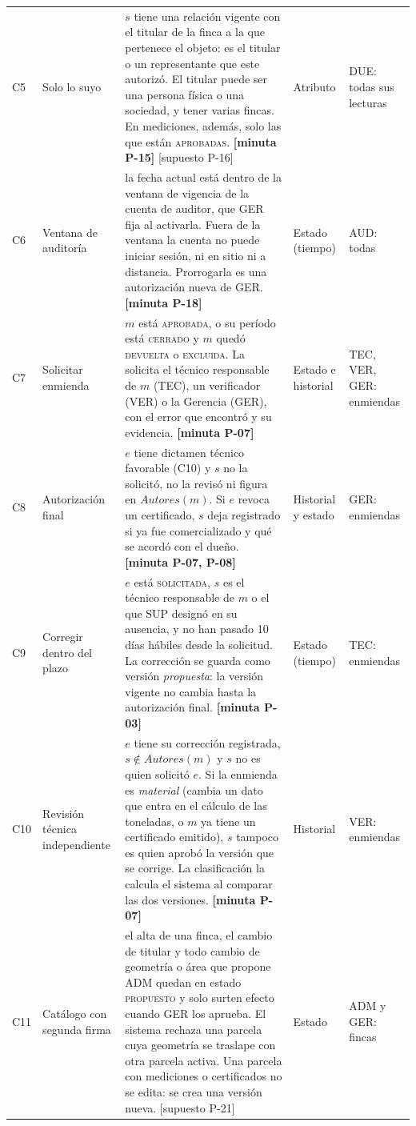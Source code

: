 \documentclass[11pt,letterpaper]{article}
\newcommand{\resp}[1]{\textrm{\footnotesize\bfseries [minuta #1]}}
\newcommand{\supu}[1]{\textrm{\footnotesize [supuesto #1]}}
\newcommand{\est}[1]{\textsc{\small #1}}
\begin{document}
{\begin{longtable}{@{}L{0.8cm} L{2.5cm} L{8.0cm} L{1.7cm} L{1.95cm}@{}}
C5 & Solo lo suyo &
$s$ tiene una relación vigente con el titular de la finca a la que pertenece el objeto: es el titular
o un representante que este autorizó. El titular puede ser una persona física o una sociedad, y tener
varias fincas. En mediciones, además, solo las que están \est{aprobadas}. \resp{P-15} \supu{P-16} &
Atributo &
DUE: todas sus lecturas \\

C6 & Ventana de auditoría &
la fecha actual está dentro de la ventana de vigencia de la cuenta de auditor, que GER fija al
activarla. Fuera de la ventana la cuenta no puede iniciar sesión, ni en sitio ni a distancia.
Prorrogarla es una autorización nueva de GER. \resp{P-18} &
Estado (tiempo) &
AUD: todas \\

C7 & Solicitar enmienda &
$m$ está \est{aprobada}, o su período está \est{cerrado} y $m$ quedó \est{devuelta} o
\est{excluida}. La solicita el técnico responsable de $m$ (TEC), un verificador (VER) o la Gerencia
(GER), con el error que encontró y su evidencia. \resp{P-07} &
Estado e historial &
TEC, VER, GER: enmiendas \\

C8 & Autorización final &
$e$ tiene dictamen técnico favorable (C10) y $s$ no la solicitó, no la revisó ni figura en
$\mathit{Autores}(m)$. Si $e$ revoca un certificado, $s$ deja registrado si ya fue comercializado y qué
se acordó con el dueño. \resp{P-07, P-08} &
Historial y estado &
GER: enmiendas \\

C9 & Corregir dentro del plazo &
$e$ está \est{solicitada}, $s$ es el técnico responsable de $m$ o el que SUP designó en su ausencia,
y no han pasado 10 días hábiles desde la solicitud. La corrección se guarda como versión
\emph{propuesta}: la versión vigente no cambia hasta la autorización final. \resp{P-03} &
Estado (tiempo) &
TEC: enmiendas \\

C10 & Revisión técnica independiente &
$e$ tiene su corrección registrada, $s \notin \mathit{Autores}(m)$ y $s$ no es quien solicitó $e$. Si
la enmienda es \emph{material} (cambia un dato que entra en el cálculo de las toneladas, o $m$ ya
tiene un certificado emitido), $s$ tampoco es quien aprobó la versión que se corrige. La
clasificación la calcula el sistema al comparar las dos versiones. \resp{P-07} &
Historial &
VER: enmiendas \\

C11 & Catálogo con segunda firma &
el alta de una finca, el cambio de titular y todo cambio de geometría o área que propone ADM quedan en
estado \est{propuesto} y solo surten efecto cuando GER los aprueba. El sistema rechaza una parcela
cuya geometría se traslape con otra parcela activa. Una parcela con mediciones o certificados no se
edita: se crea una versión nueva. \supu{P-21} &
Estado &
ADM y GER: fincas \\


\end{longtable}}
\end{document}
